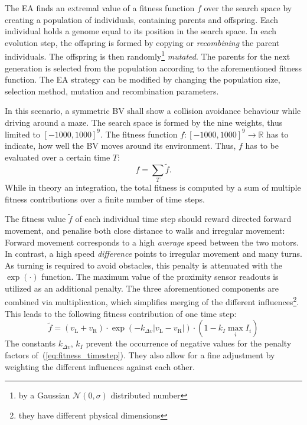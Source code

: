 \documentclass[a4paper]{jacow}
\begin{document}
The EA finds an extremal value of a fitness function $f$ over the search space by creating a population of individuals, containing parents and offspring. Each individual holds a genome equal to its position in the search space. In each evolution step, the offspring is formed by copying or \emph{recombining} the parent individuals. The offspring is then randomly\footnote{by a Gaussian $\mathcal{N}(0,\sigma)$ distributed number} \emph{mutated}. The parents for the next generation is selected from the population according to the aforementioned fitness function. The EA strategy can be modified by changing the population size, selection method, mutation and recombination parameters.

In this scenario, a symmetric BV shall show a collision avoidance behaviour while driving around a maze. The search space is formed by the nine weights, thus limited to $[-1000,1000]^9$. The fitness function \mbox{$f:[-1000,1000]^9\to \mathbb{R}$} has to indicate, how well the BV moves around its environment. Thus, $f$ has to be evaluated over a certain time $T$:
\begin{equation}
	f = \sum\limits_T \tilde{f}.
\end{equation}
While in theory an integration, the total fitness is computed by a sum of multiple fitness contributions over a finite number of time steps. 

The fitness value $\tilde{f}$ of each individual time step should reward directed forward movement, and penalise both close distance to walls and irregular movement: Forward movement corresponds to a high \emph{average} speed between the two motors. In contrast, a high speed \emph{difference} points to irregular movement and many turns. As turning is required to avoid obstacles, this penalty is attenuated with the $\exp(\cdot)$ function. The maximum value of the proximity sensor readouts is utilized as an additional penalty. The three aforementioned components are combined via multiplication, which simplifies merging of the different influences\footnote{they have different physical dimensions}. This leads to the following fitness contribution of one time step:
\begin{equation}
	\tilde{f} = \left( v_\mathrm{L} + v_\mathrm{R} \right) \cdot \exp\left( - k_{\Delta v}|v_\mathrm{L}-v_\mathrm{R}| \right) \cdot \left(1- k_{I} \max\limits_i I_i\right)
	\label{eq:fitness_timestep} 
\end{equation}
The constants $k_{\Delta v}$, $k_I$ prevent the occurrence of negative values for the penalty factors of~(\ref{eq:fitness_timestep}). They also allow for a fine adjustment by weighting the different influences against each other.
\end{document}
